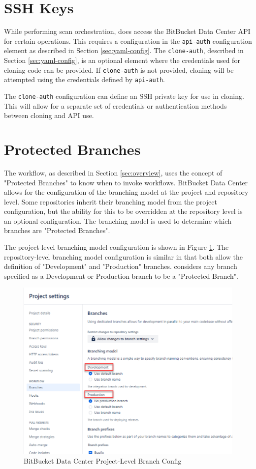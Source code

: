 \section{\cxoneflow SSH Keys}

While performing scan orchestration, \cxoneflow does access the BitBucket Data Center API for
certain operations.  This requires a configuration in the \texttt{api-auth} configuration
element as described in Section \ref{sec:yaml-config}.  The \texttt{clone-auth},
described in Section \ref{sec:yaml-config}, is an optional element where the credentials
used for cloning code can be provided.  If \texttt{clone-auth} is not provided, cloning will
be attempted using the credentials defined by \texttt{api-auth}.

The \texttt{clone-auth} configuration can define an SSH private key for use in cloning.  This
will allow for a separate set of credentials or authentication methods between cloning and
API use.


\section{Protected Branches}

The \cxoneflow workflow, as described in Section \ref{sec:overview}, uses the concept of "Protected Branches"
to know when to invoke workflows.  BitBucket Data Center allows for the configuration of the branching model
at the project and repository level.  Some repositories inherit their branching model from the project
configuration, but the ability for this to be overridden at the repository level is an optional configuration.
The branching model is used to determine which branches are "Protected Branches".

The project-level branching model configuration is shown in Figure \ref{fig:bbdc-branch-config}.  The
repository-level branching model configuration is similar in that both allow the definition of
"Development" and "Production" branches.  \cxoneflow considers any branch specified as a Development
or Production branch to be a "Protected Branch".

\begin{figure}[ht]
    \includegraphics[width=\textwidth]{graphics/bbdc-branch-config.png}
    \caption{BitBucket Data Center Project-Level Branch Config}
    \label{fig:bbdc-branch-config}
\end{figure}

